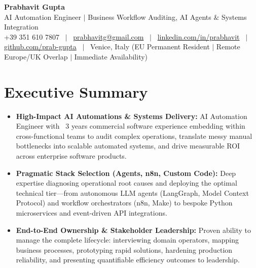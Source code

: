 \documentclass[a4paper,10pt]{article}
\begin{document}
\begin{minipage}[c]{0.80\textwidth}
  {\Huge\bfseries Prabhavit Gupta}\\[3pt]
  {\color{accent}\large AI Automation Engineer $\vert$ Business Workflow Auditing, AI Agents $\&$ Systems Integration}\\[6pt]
  {\footnotesize +39 351 610 7807 ~$\vert$~
  \href{mailto:prabhavitg@gmail.com}{prabhavitg@gmail.com} ~$\vert$~
  \href{https://www.linkedin.com/in/prabhavit/}{linkedin.com/in/prabhavit} ~$\vert$~
  \href{https://github.com/prab-gupta}{github.com/prab-gupta} ~$\vert$~
  Venice, Italy (EU Permanent Resident $\vert$ Remote Europe/UK Overlap $\vert$ Immediate Availability)}
\end{minipage}\hfill

\vspace{6pt}

\section{Executive Summary}
\begin{itemize}
  \item \textbf{High-Impact AI Automations \& Systems Delivery:} AI Automation Engineer with ~3 years commercial software experience embedding within cross-functional teams to audit complex operations, translate messy manual bottlenecks into scalable automated systems, and drive measurable ROI across enterprise software products.
  \item \textbf{Pragmatic Stack Selection (Agents, n8n, Custom Code):} Deep expertise diagnosing operational root causes and deploying the optimal technical tier---from autonomous LLM agents (LangGraph, Model Context Protocol) and workflow orchestrators (n8n, Make) to bespoke Python microservices and event-driven API integrations.
  \item \textbf{End-to-End Ownership \& Stakeholder Leadership:} Proven ability to manage the complete lifecycle: interviewing domain operators, mapping business processes, prototyping rapid solutions, hardening production reliability, and presenting quantifiable efficiency outcomes to leadership.
\end{itemize}

\end{document}
